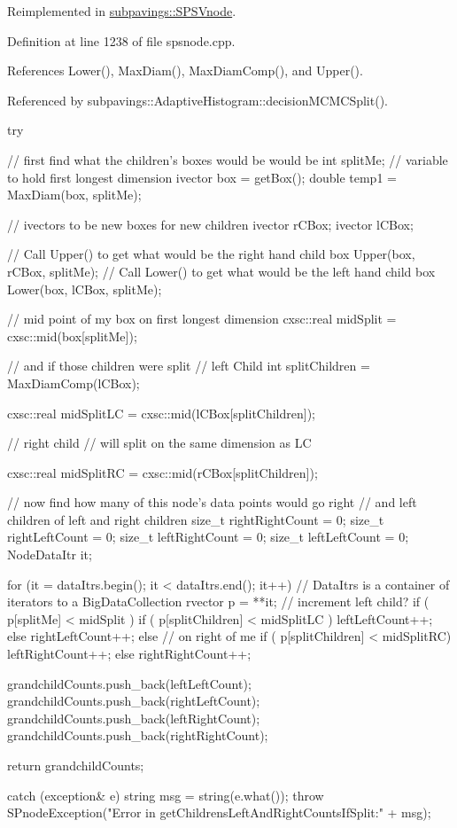 \-Reimplemented in \hyperlink{classsubpavings_1_1SPSVnode_ad1e930cb7befb42cd1985e91f3ddd9b6}{subpavings\-::\-S\-P\-S\-Vnode}.



\-Definition at line 1238 of file spsnode.\-cpp.



\-References \-Lower(), \-Max\-Diam(), \-Max\-Diam\-Comp(), and \-Upper().



\-Referenced by subpavings\-::\-Adaptive\-Histogram\-::decision\-M\-C\-M\-C\-Split().


\begin{DoxyCode}
  {
    try {

      // first find what the children's boxes would be would be
      int splitMe; // variable to hold first longest dimension
      ivector box = getBox();
      double temp1 = MaxDiam(box, splitMe);

      // ivectors to be new boxes for new children
      ivector rCBox;
      ivector lCBox;
      
      // Call Upper() to get what would be the right hand child box
      Upper(box, rCBox, splitMe);
      // Call Lower() to get what would be the left hand child box
      Lower(box, lCBox, splitMe);
      
      // mid point of my box on first longest dimension
      cxsc::real midSplit = cxsc::mid(box[splitMe]);

      // and if those children were split
      // left Child 
      int splitChildren = MaxDiamComp(lCBox);
      
      cxsc::real midSplitLC = cxsc::mid(lCBox[splitChildren]);
      
      // right child 
      // will split on the same dimension as LC
      
      cxsc::real midSplitRC = cxsc::mid(rCBox[splitChildren]);
      
      // now find how many of this node's data points would go right
      // and left children of left and right children
      size_t rightRightCount = 0;
      size_t rightLeftCount = 0;
      size_t leftRightCount = 0;
      size_t leftLeftCount = 0;
      NodeDataItr it;

      for (it = dataItrs.begin(); it < dataItrs.end(); it++) {
        // DataItrs is a container of iterators to a BigDataCollection
        rvector p = **it;
        // increment left child?
        if ( p[splitMe] < midSplit ) {
          if ( p[splitChildren] < midSplitLC ) leftLeftCount++;
          else rightLeftCount++;
        }
        else { // on right of me
          if ( p[splitChildren] < midSplitRC) leftRightCount++;
          else rightRightCount++;
        }
      }

      grandchildCounts.push_back(leftLeftCount);
      grandchildCounts.push_back(rightLeftCount);
      grandchildCounts.push_back(leftRightCount);
      grandchildCounts.push_back(rightRightCount);


      return grandchildCounts;
    }
    catch (exception& e) {
      string msg = string(e.what());
      throw SPnodeException("Error in getChildrensLeftAndRightCountsIfSplit:\n"
       + msg);
    }
  }
\end{DoxyCode}
